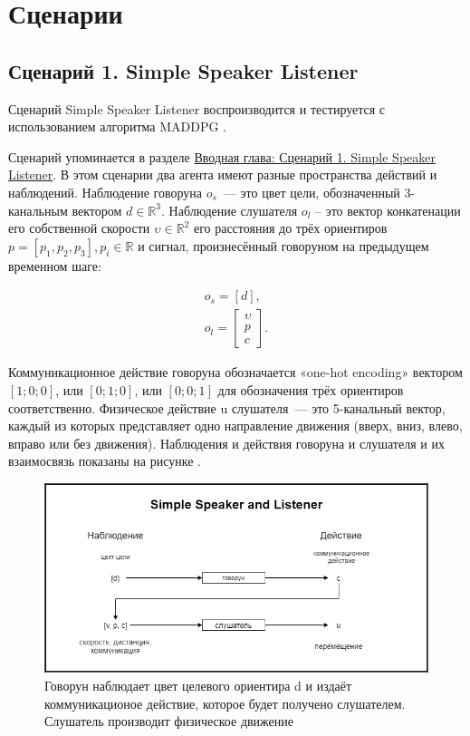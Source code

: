 \section{Сценарии}

\subsection{Сценарий 1. Simple Speaker Listener}  \label{exp-ssl}

Сценарий Simple Speaker Listener воспроизводится и тестируется с использованием алгоритма MADDPG \cite{lowe2017multiagent}.

Сценарий упоминается в разделе \hyperref[intro:ssl]{Вводная глава: Сценарий 1. Simple Speaker Listener}. В этом сценарии два агента имеют разные пространства действий и наблюдений. Наблюдение говоруна $o_s$~--- это цвет цели, обозначенный 3- канальным вектором $d \in \mathbb{R}^3$. Наблюдение слушателя $o_l$ – это вектор конкатенации его собственной скорости $\upsilon \in \mathbb{R}^2$ его расстояния до трёх ориентиров $p = [p_1, p_2, p_3], p_i \in \mathbb{R}$ и сигнал, произнесённый говоруном на предыдущем временном шаге:

\begin{equation}
    \begin{multlined}
        o_s = [d], \\
        o_l = \begin{bmatrix}
                  \upsilon \\ p \\ c
        \end{bmatrix}.
    \end{multlined}
\end{equation}

Коммуникационное действие говоруна обозначается «one-hot encoding» вектором ${[1; 0; 0]}$, или ${[0; 1; 0]}$, или ${[0; 0; 1]}$ для обозначения трёх ориентиров соответственно.
Физическое действие u слушателя~--- это 5-канальный вектор, каждый из которых представляет одно направление движения (вверх, вниз, влево, вправо или без движения). Наблюдения и действия говоруна и слушателя и их взаимосвязь показаны на рисунке .

\begin{figure}[ht!]
    \center
    \includegraphics [scale=0.60] {my_folder/images/ch4/simple_speaker_listener.png}
    \caption{Говорун наблюдает цвет целевого ориентира d и издаёт коммуникационое действие, которое будет получено слушателем. Слушатель производит физическое движение}
    \label{fig:ch4-ssl}
\end{figure}


